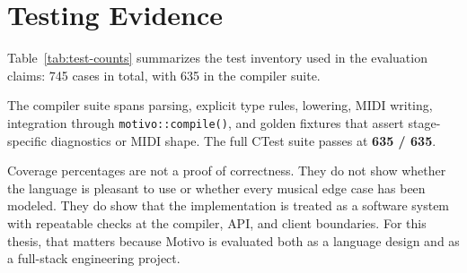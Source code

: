\section{Testing Evidence}\label{sec:test-evidence}

Table~\ref{tab:test-counts} summarizes the test inventory used in the evaluation claims: 745 cases in total, with 635 in
the compiler suite.

The compiler suite spans parsing, explicit type rules, lowering, MIDI writing, integration through
\texttt{motivo::compile()}, and golden fixtures that assert stage-specific diagnostics or MIDI shape.
The full CTest suite passes at \textbf{635 / 635}.

Coverage percentages are not a proof of correctness.
They do not show whether the language is pleasant to use or whether every musical edge case has been modeled.
They do show that the implementation is treated as a software system with repeatable checks at the compiler, API, and
client boundaries.
For this thesis, that matters because Motivo is evaluated both as a language design and as a full-stack engineering
project.
